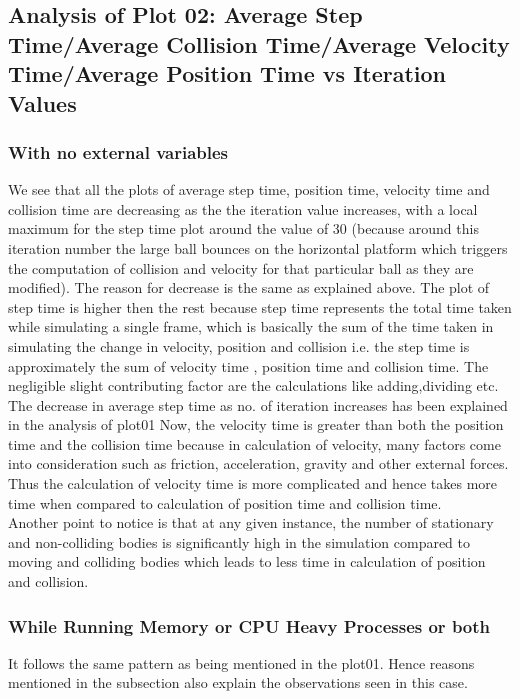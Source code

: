 \documentclass[11pt]{article}
\begin{document}
\subsection{Analysis of Plot 02: Average Step Time/Average Collision Time/Average Velocity Time/Average Position Time vs Iteration Values}
\subsubsection { With no external variables}
We see that all the plots of average step time, position time, velocity time and collision time are decreasing as the the iteration value increases, with a local maximum for the step time plot around the value of 30 (because around this iteration number the large ball bounces on the horizontal platform which triggers the computation of collision and velocity for that particular ball as they are modified). The reason for decrease is the same as explained above. The plot of step time is higher then the rest because step time represents the total time taken while simulating a single frame, which is basically the sum of the time taken in simulating the change in velocity, position and  collision i.e. the step time is approximately the sum of velocity time , position time and collision time. The negligible slight contributing factor are the calculations like adding,dividing etc.
\\ 
The decrease in average step time as no. of iteration increases has been explained in the analysis of plot01
Now, the velocity time is greater than both the position time and the collision time because in calculation of velocity, many factors come into consideration such as friction, acceleration, gravity and other external forces. Thus the calculation of velocity time is more complicated and hence takes more time when compared to calculation of position time and collision time.
\\
Another point to notice is that at any given instance, the number of stationary and non-colliding bodies is significantly high in the simulation compared to moving and colliding bodies which leads to less time in calculation of position and collision.

\subsubsection{While Running Memory or CPU Heavy Processes or both}
It follows the same pattern as being mentioned in the plot01. Hence reasons mentioned in the subsection also explain the observations seen in this case.
\end{document}
